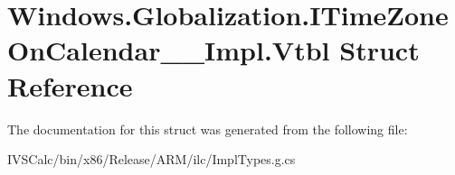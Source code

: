 \hypertarget{struct_windows_1_1_globalization_1_1_i_time_zone_on_calendar_____impl_1_1_vtbl}{}\section{Windows.\+Globalization.\+I\+Time\+Zone\+On\+Calendar\+\_\+\+\_\+\+Impl.\+Vtbl Struct Reference}
\label{struct_windows_1_1_globalization_1_1_i_time_zone_on_calendar_____impl_1_1_vtbl}


The documentation for this struct was generated from the following file\+:\begin{DoxyCompactItemize}
\item 
I\+V\+S\+Calc/bin/x86/\+Release/\+A\+R\+M/ilc/Impl\+Types.\+g.\+cs\end{DoxyCompactItemize}
